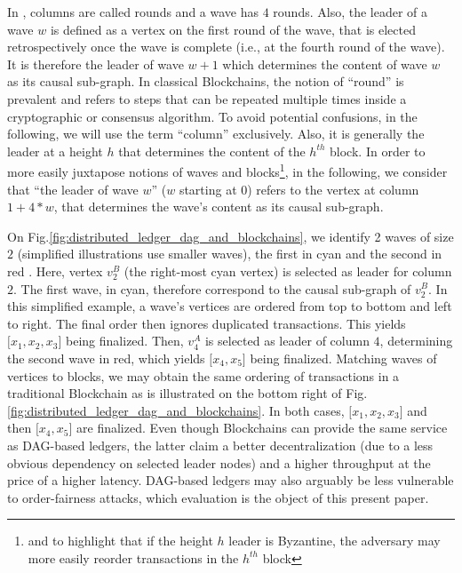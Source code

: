 In \cite{all_you_need_is_dag}, columns are called rounds and a wave has $4$ rounds.
Also, the leader of a wave $w$ is defined as a vertex on the first round of the wave, that is elected retrospectively once the wave is complete (i.e., at the fourth round of the wave). It is therefore the leader of wave $w+1$ which determines the content of wave $w$ as its causal sub-graph.
In classical Blockchains, the notion of ``round'' is prevalent and refers to steps that can be repeated multiple times inside a cryptographic or consensus algorithm.
To avoid potential confusions, in the following, we will use the term ``column'' exclusively.
Also, it is generally the leader at a height $h$ that determines the content of the $h^{th}$ block.
In order to more easily juxtapose notions of waves and blocks\footnote{and to highlight that if the height $h$ leader is Byzantine, the adversary may more easily reorder transactions in the $h^{th}$ block}, in the following, we consider that ``the leader of wave $w$'' ($w$ starting at $0$) refers to the vertex at column $1 + 4*w$, that determines the wave's content as its causal sub-graph.


On Fig.\ref{fig:distributed_ledger_dag_and_blockchains}, we identify 2 waves of size $2$ (simplified illustrations use smaller waves), the first in cyan and the second in red .
Here, vertex $v_2^B$ (the right-most cyan vertex) is selected as leader for column $2$. 
The first wave, in cyan, therefore correspond to the causal sub-graph of $v_2^B$. 
In this simplified example, a wave's vertices are ordered from top to bottom and left to right. The final order then ignores duplicated transactions.
This yields $\lbrack x_1,x_2,x_3 \rbrack$ being finalized. 
Then, $v_4^A$ is selected as leader of column $4$, determining the second wave in red, which yields $\lbrack x_4,x_5 \rbrack$ being finalized.
Matching waves of vertices to blocks, we may obtain the same ordering of transactions in a traditional Blockchain as is illustrated on the bottom right of Fig.\ref{fig:distributed_ledger_dag_and_blockchains}.
In both cases, $\lbrack x_1, x_2, x_3 \rbrack$ and then $\lbrack x_4,x_5 \rbrack$ are finalized.
Even though Blockchains can provide the same service as DAG-based ledgers, the latter claim a better decentralization (due to a less obvious dependency on selected leader nodes) and a higher throughput at the price of a higher latency.
DAG-based ledgers may also arguably be less vulnerable to order-fairness attacks, which evaluation is the object of this present paper.


